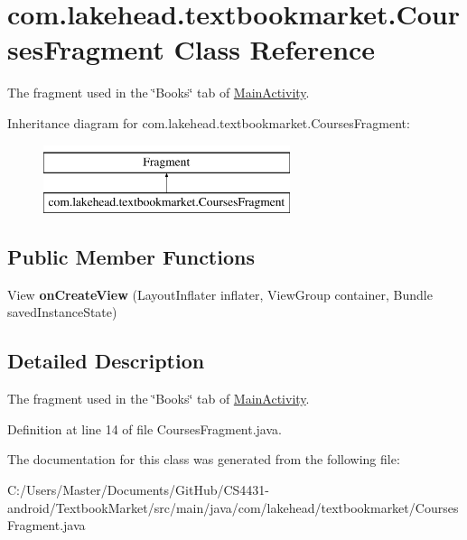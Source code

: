 \hypertarget{classcom_1_1lakehead_1_1textbookmarket_1_1_courses_fragment}{\section{com.\-lakehead.\-textbookmarket.\-Courses\-Fragment Class Reference}
\label{classcom_1_1lakehead_1_1textbookmarket_1_1_courses_fragment}
}


The fragment used in the \char`\"{}\-Books\char`\"{} tab of \hyperlink{classcom_1_1lakehead_1_1textbookmarket_1_1_main_activity}{Main\-Activity}.  


Inheritance diagram for com.\-lakehead.\-textbookmarket.\-Courses\-Fragment\-:\begin{figure}[H]
\begin{center}
\leavevmode
\includegraphics[height=2.000000cm]{classcom_1_1lakehead_1_1textbookmarket_1_1_courses_fragment}
\end{center}
\end{figure}
\subsection*{Public Member Functions}
\begin{DoxyCompactItemize}
\item 
\hypertarget{classcom_1_1lakehead_1_1textbookmarket_1_1_courses_fragment_a15ded43e8fedcd7effe208fcebf46803}{View {\bfseries on\-Create\-View} (Layout\-Inflater inflater, View\-Group container, Bundle saved\-Instance\-State)}\label{classcom_1_1lakehead_1_1textbookmarket_1_1_courses_fragment_a15ded43e8fedcd7effe208fcebf46803}

\end{DoxyCompactItemize}


\subsection{Detailed Description}
The fragment used in the \char`\"{}\-Books\char`\"{} tab of \hyperlink{classcom_1_1lakehead_1_1textbookmarket_1_1_main_activity}{Main\-Activity}. 

Definition at line 14 of file Courses\-Fragment.\-java.



The documentation for this class was generated from the following file\-:\begin{DoxyCompactItemize}
\item 
C\-:/\-Users/\-Master/\-Documents/\-Git\-Hub/\-C\-S4431-\/android/\-Textbook\-Market/src/main/java/com/lakehead/textbookmarket/Courses\-Fragment.\-java\end{DoxyCompactItemize}
